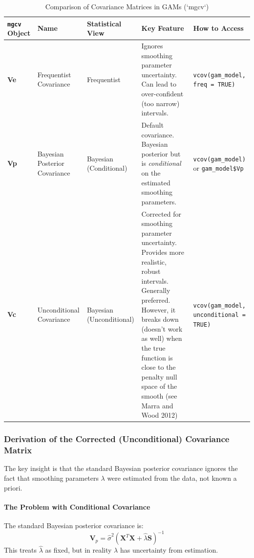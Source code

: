 \documentclass[12pt]{article}
\begin{document}
\begin{table}[h!]
\centering
\caption{Comparison of Covariance Matrices in GAMs (`mgcv`)}
\label{tab:covariance_matrices}
\begin{tabularx}{\linewidth}{>{\RaggedRight}p{1.5cm} >{\RaggedRight}p{2.2cm} >{\RaggedRight}p{2.5cm} >{\RaggedRight}X >{\RaggedRight\arraybackslash}X}
\toprule
\textbf{\texttt{mgcv} Object} & \textbf{Name} & \textbf{Statistical View} & \textbf{Key Feature} & \textbf{How to Access} \\
\midrule
\textbf{Ve} & Frequentist Covariance & Frequentist & Ignores smoothing parameter uncertainty. Can lead to over-confident (too narrow) intervals. & \texttt{vcov(gam\_model, freq = TRUE)} \\
\addlinespace
\textbf{Vp} & Bayesian Posterior Covariance & Bayesian (Conditional) & Default covariance. Bayesian posterior but is \textit{conditional} on the estimated smoothing parameters. & \texttt{vcov(gam\_model)} or \texttt{gam\_model\$Vp} \\
\addlinespace
\textbf{Vc} & Unconditional Covariance & Bayesian (Unconditional) & Corrected for smoothing parameter uncertainty. Provides more realistic, robust intervals. Generally preferred. However,  it breaks down (doesn't work as well) when the true function is close to the penalty null space of the smooth (see Marra and Wood 2012) & \texttt{vcov(gam\_model, unconditional = TRUE)} \\
\bottomrule
\end{tabularx}
\end{table}


\subsubsection{Derivation of the Corrected (Unconditional) Covariance Matrix}

The key insight is that the standard Bayesian posterior covariance ignores the fact that smoothing parameters $\lambda$ were estimated from the data, not known a priori.

\paragraph{The Problem with Conditional Covariance}
The standard Bayesian posterior covariance is:
\begin{equation}
\mathbf{V}_p = \hat{\sigma}^2(\mathbf{X}^T\mathbf{X} + \hat{\lambda}\mathbf{S})^{-1}
\end{equation}
This treats $\hat{\lambda}$ as fixed, but in reality $\lambda$ has uncertainty from estimation.
\end{document}
